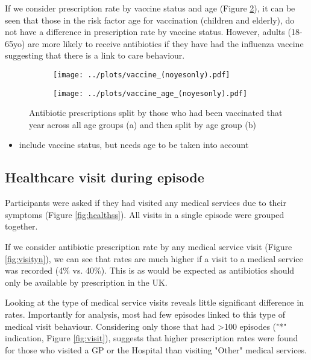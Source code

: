 \documentclass{article}
\begin{document}
If we consider prescription rate by vaccine status and age (Figure \ref{fig:vx.age}), it can be seen that those in the risk factor age for vaccination (children and elderly), do not have a difference in prescription rate by vaccine status. However, adults (18-65yo) are more likely to receive antibiotics if they have had the influenza vaccine suggesting that there is a link to care behaviour. 

\begin{figure}[htbp]
    \centering
    \begin{subfigure}[b]{0.45\textwidth}
   		\texttt{[image: ../plots/vaccine\_(noyesonly).pdf]}
   		\caption{}
   		\label{fig:vx}
    \end{subfigure}
    \begin{subfigure}[b]{0.45\textwidth}
        \texttt{[image: ../plots/vaccine\_age\_(noyesonly).pdf]}
		\caption{}
		\label{fig:vx.age}
    \end{subfigure}
    \caption{Antibiotic prescriptions split by those who had been vaccinated that year across all age groups (a) and then split by age group (b)}
    \label{fig:vxf}
\end{figure}

\begin{itemize}
	\item include vaccine status, but needs age to be taken into account
\end{itemize}


\subsection{Healthcare visit during episode}

Participants were asked if they had visited any medical services due to their symptoms (Figure \ref{fig:healthss}). All visits in a single episode were grouped together.

If we consider antibiotic prescription rate by any medical service visit (Figure \ref{fig:visityn}), we can see that rates are much higher if a visit to a medical service was recorded (4\% vs. 40\%). This is as would be expected as antibiotics should only be available by prescription in the UK. 

Looking at the type of medical service visits reveals little significant difference in rates. Importantly for analysis, most had few episodes linked to this type of medical visit behaviour. Considering only those that had \textgreater 100 episodes ("*" indication, Figure \ref{fig:visit}), suggests that higher prescription rates were found for those who visited a GP or the Hospital than visiting "Other" medical services. 
\end{document}
